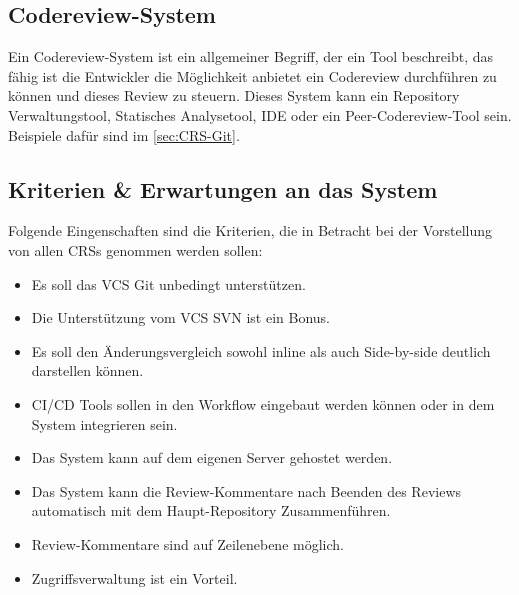 \subsection{Codereview-System}
\label{subsec:CRS}

Ein Codereview-System ist ein allgemeiner Begriff, der ein Tool beschreibt, das fähig ist die Entwickler die Möglichkeit anbietet ein Codereview durchführen zu können und dieses Review zu steuern. Dieses System kann ein Repository Verwaltungstool, Statisches Analysetool, IDE oder ein Peer-Codereview-Tool sein. Beispiele dafür sind im \cref{sec:CRS-Git}.

\subsection{Kriterien \& Erwartungen an das System}
\label{sec:kriterien}

Folgende Eingenschaften sind die Kriterien, die in Betracht bei der Vorstellung von allen \acp{CRS} genommen werden sollen:

\begin{itemize}
	\item Es soll das \ac{VCS} Git unbedingt unterstützen.
	\item Die Unterstützung vom \ac{VCS} \ac{SVN} ist ein Bonus.
	\item Es soll den Änderungsvergleich sowohl inline als auch Side-by-side deutlich darstellen können.
	\item \ac{CI}/\ac{CD} Tools sollen in den Workflow eingebaut werden können oder in dem System integrieren sein.
	\item Das System kann auf dem eigenen Server gehostet werden.
	\item Das System kann die Review-Kommentare nach Beenden des Reviews automatisch mit dem Haupt-Repository Zusammenführen.
	\item Review-Kommentare sind auf Zeilenebene möglich.
	\item Zugriffsverwaltung ist ein Vorteil.
\end{itemize}
